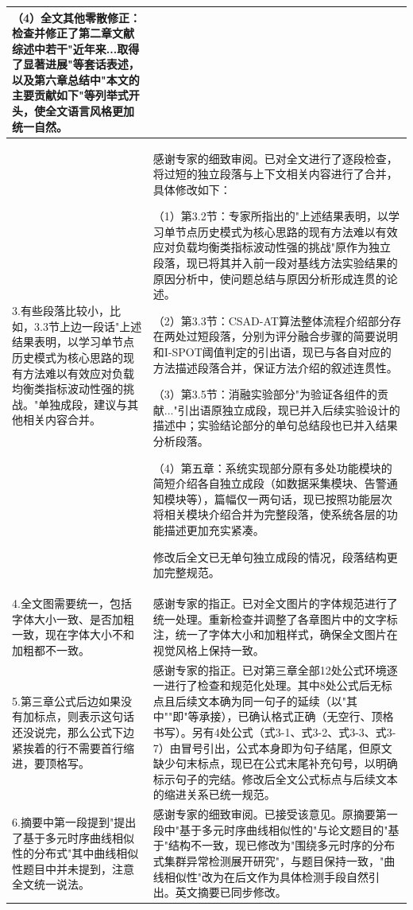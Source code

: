 \documentclass[12pt,a4paper]{article}
\begin{document}
\begin{longtable}{|p{}|p{}|}
（4）全文其他零散修正：检查并修正了第二章文献综述中若干"近年来...取得了显著进展"等套话表述，以及第六章总结中"本文的主要贡献如下"等列举式开头，使全文语言风格更加统一自然。
\\
\hline

3.有些段落比较小，比如，3.3节上边一段话"上述结果表明，以学习单节点历史模式为核心思路的现有方法难以有效应对负载均衡类指标波动性强的挑战。"单独成段，建议与其他相关内容合并。
&
感谢专家的细致审阅。已对全文进行了逐段检查，将过短的独立段落与上下文相关内容进行了合并，具体修改如下：

（1）第3.2节：专家所指出的"上述结果表明，以学习单节点历史模式为核心思路的现有方法难以有效应对负载均衡类指标波动性强的挑战"原作为独立段落，现已将其并入前一段对基线方法实验结果的原因分析中，使问题总结与原因分析形成连贯的论述。

（2）第3.3节：CSAD-AT算法整体流程介绍部分存在两处过短段落，分别为评分融合步骤的简要说明和I-SPOT阈值判定的引出语，现已与各自对应的方法描述段落合并，保证方法介绍的叙述连贯性。

（3）第3.5节：消融实验部分"为验证各组件的贡献..."引出语原独立成段，现已并入后续实验设计的描述中；实验结论部分的单句总结段也已并入结果分析段落。

（4）第五章：系统实现部分原有多处功能模块的简短介绍各自独立成段（如数据采集模块、告警通知模块等），篇幅仅一两句话，现已按照功能层次将相关模块介绍合并为完整段落，使系统各层的功能描述更加充实紧凑。

修改后全文已无单句独立成段的情况，段落结构更加完整规范。
\\
\hline

4.全文图需要统一，包括字体大小一致、是否加粗一致，现在字体大小不和加粗都不一致。
&
感谢专家的指正。已对全文图片的字体规范进行了统一处理。重新检查并调整了各章图片中的文字标注，统一了字体大小和加粗样式，确保全文图片在视觉风格上保持一致。
\\
\hline

5.第三章公式后边如果没有加标点，则表示这句话还没说完，那么公式下边紧挨着的行不需要首行缩进，要顶格写。
&
感谢专家的指正。已对第三章全部12处公式环境逐一进行了检查和规范化处理。其中8处公式后无标点且后续文本确为同一句子的延续（以"其中""即"等承接），已确认格式正确（无空行、顶格书写）。另有4处公式（式3-1、式3-2、式3-3、式3-7）由冒号引出，公式本身即为句子结尾，但原文缺少句末标点，现已在公式末尾补充句号，以明确标示句子的完结。修改后全文公式标点与后续文本的缩进关系已统一规范。
\\
\hline

6.摘要中第一段提到"提出了基于多元时序曲线相似性的分布式"其中曲线相似性题目中并未提到，注意全文统一说法。
&
感谢专家的细致审阅。已接受该意见。原摘要第一段中"基于多元时序曲线相似性的"与论文题目的"基于"结构不一致，现已修改为"围绕多元时序的分布式集群异常检测展开研究"，与题目保持一致，"曲线相似性"改为在后文作为具体检测手段自然引出。英文摘要已同步修改。
\\
\hline

\end{longtable}
\end{document}

